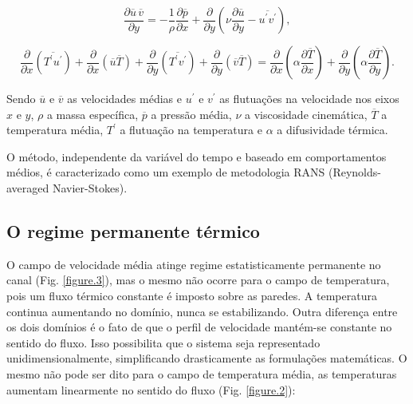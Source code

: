 \begin{equation}\label{dynamics}
\frac{\partial \overline{u} \, \overline{v}}{\partial y} = 
- \frac{1}{\rho} \frac{\partial \overline{p}}{\partial x} + \frac{\partial}{\partial y}\left(\nu \frac{\partial \overline{u}}{\partial y} - \overline{u^\prime v^\prime}\right),
\end{equation}


\begin{equation}\label{energy permanent}
\frac{\partial{}}{\partial{x}} \left(\overline{T^\prime u^\prime}\right) + \frac{\partial{}}{\partial{x}}\left(\overline{u} \overline{T}\right)     + 
\frac{\partial{}}{\partial{y}} \left(\overline{T^\prime v^\prime}\right) + \frac{\partial{}}{\partial{y}}\left(\overline{v} \overline{T}\right) 
=
{\frac{\partial{}}{\partial{x}}} \left(\alpha {\frac{\partial{\overline{T}}}{\partial{x}}} \right) +
{\frac{\partial{}}{\partial{y}}} \left(\alpha {\frac{\partial{\overline{T}}}{\partial{y}}} \right). 
\end{equation}

Sendo $\overline{u}$ e $\overline{v}$ as velocidades médias e $u^\prime$ e $v^\prime$ as flutuações na velocidade nos eixos $x$ e $y$, $\rho$ a massa específica, $\overline{p}$ a pressão média, $\nu$ a viscosidade cinemática, $\overline{T}$ a temperatura média, $T^\prime$ a flutuação na temperatura e $\alpha$ a difusividade térmica.

O método, independente da variável do tempo e baseado em comportamentos médios, é caracterizado como um exemplo de metodologia RANS (Reynolds-averaged Navier-Stokes).


\subsection{O regime permanente térmico}

O campo de velocidade média atinge regime estatisticamente permanente no canal (Fig. \ref{figure.3}), mas o mesmo não ocorre para o campo de temperatura, pois um fluxo térmico constante é imposto sobre as paredes. A temperatura continua aumentando no domínio, nunca se estabilizando.
Outra diferença entre os dois domínios é o fato de que o perfil de velocidade mantém-se constante no sentido do fluxo. Isso possibilita que o sistema seja representado unidimensionalmente, simplificando drasticamente as formulações matemáticas. O mesmo não pode ser dito para o campo de temperatura média, as temperaturas aumentam linearmente no sentido do fluxo (Fig. \ref{figure.2}):

